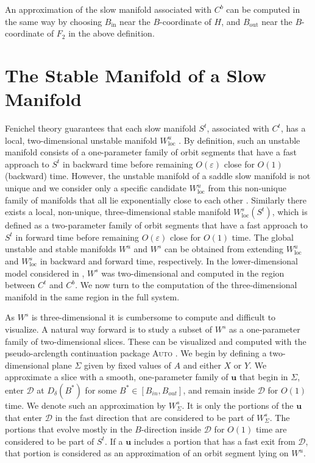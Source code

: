 \documentclass{ws-ijbc}
\begin{document}
An approximation of the slow manifold associated with $C^b$ can be computed in the same way by choosing $B_{\mathrm{in}}$ near the $B$-coordinate of $H$, and $B_{\mathrm{out}}$ near the $B$-coordinate of $F_2$ in the above definition.

\section{The Stable Manifold of a Slow Manifold}

Fenichel theory guarantees that each slow manifold $S^t$, associated with $C^t$, has a local, two-dimensional unstable manifold $W_{\mathrm{loc}}^u$ \cite{Fenichel}.  By definition, such an unstable manifold consists of a one-parameter family of orbit segments that have a fast approach to $S^t$ in backward time before remaining $O(\varepsilon)$ close for $O(1)$ (backward) time.  However, the unstable manifold of a saddle slow manifold is not unique and we consider only a specific candidate $W_{\mathrm{loc}}^u$ from this non-unique family of manifolds that all lie exponentially close to each other \cite{Fenichel}.  Similarly there exists a local, non-unique, three-dimensional stable manifold $W^s_{\mathrm{loc}}(S^t)$, which is defined as a two-parameter family of orbit segments that have a fast approach to $S^t$ in forward time before remaining $O(\varepsilon)$ close for $O(1)$ time.  The global unstable and stable manifolds $W^u$ and $W^s$ can be obtained from extending $W^u_{\mathrm{loc}}$ and $W^s_{\mathrm{loc}}$ in backward and forward time, respectively.  In the lower-dimensional model considered in \cite{QSSA}, $W^s$ was two-dimensional and computed in the region between $C^t$ and $C^b$.  We now turn to the computation of the three-dimensional manifold in the same region in the full system.
    
As $W^s$ is three-dimensional it is cumbersome to compute and difficult to visualize.  A natural way forward is to study a subset of $W^s$ as a one-parameter family of two-dimensional slices.  These can be visualized and computed with the pseudo-arclength continuation package \textsc{Auto} \cite{AUTO}.  We begin by defining a two-dimensional plane $\Sigma$ given by fixed values of $A$ and either $X$ or $Y$.  We approximate a slice with a smooth, one-parameter family of $\mathbf{u}$ that begin in $\Sigma$, enter $\mathscr{D}$ at $D_{\delta}(B^*)$ for some $B^* \in [B_{in}, B_{out}]$, and remain inside $\mathscr{D}$ for $O(1)$ time.  We denote such an approximation by $W^{s}_{\Sigma}$.  It is only the portions of the $\mathbf{u}$ that enter $\mathscr{D}$ in the fast direction that are considered to be part of $W^{s}_{\Sigma}$.  The portions that evolve mostly in the $B$-direction inside $\mathscr{D}$ for $O(1)$ time are considered to be part of $S^t$.  If a $\mathbf{u}$ includes a portion that has a fast exit from $\mathscr{D}$, that portion is considered as an approximation of an orbit segment lying on $W^u$.
    
\end{document}
